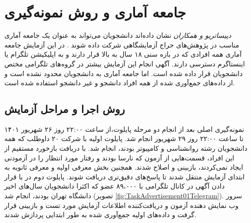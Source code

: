\section{جامعه آماری و روش نمونه‌گیری}
\textit{دپیساتریو و همکاران}
نشان داده‌اند دانشجویان می‌تواند به عنوان یک جامعه آماری مناسب در پژوهش‌های حراج آزمایشگاهی شرکت داده شوند
\!\citep{depositarioShouldStudentsBe2009}
\!. در این آزمایش جامعه آماری همه افرادی که در بازه سنی ۱۸ سال به بالا قرار دارند و به اپلیکیشن تلگرام یا اینستاگرم 
دسترسی دارند. آگهی انجام این آزمایش بیشتر در گروه‌های تلگرامی  مختص دانشجویان قرار داده شده است. اما جامعه آماری به دانشجویان 
محدود نشده است و از داده‌های جمع‌آوری شده از همه افراد دانشجو و غیر دانشجو استفاده شده است.
\subsection{روش اجرا و مراحل آزمایش}
نمونه‌گیری اصلی بعد از انجام دو مرحله پایلوت،از ساعت ۲۲:۰۰ روز ۲۶ شهریور ۱۴۰۱ تا ساعت ۲۲:۰۰ روز ۲۹ شهریور انجام شد. 
پایلوت اولیه با شرکت ۲۰  داوطلب که همه دانشجویان رشته روانشناسی و کامپیوتر بودند، انجام شد. با دریافت بازخورد مستقیم از این افراد، قسمت‌هایی از 
آزمون که نارسا بودند و رفتار مورد انتظار را در آزمودنی ایجاد نمی‌کردند، بازبینی و اصلاح شدند. همچنین بخش معرفی اولیه و معرفی ثانویه به ابتدای آزمایش منتقل شدند تا پاسخ‌های
دقیق‌تری دریافت شوند. پایلوت دوم در با قرار دادن آگهی در کانال تلگرامی با ۸۹،۰۰۰ عضو که اکثرا دانشجویان سال‌های اخیر دانشگاه تهران بودند، انجام شد
(\!تصویر \ref{fig:TaskAdvertisement01Telegram}).
سرور وب نمایش دهنده آزمون و دریافت‌کننده  اطلاعات آزمایش مورد تست و بازبینی قرار گرفت و داده‌های اولیه جمع‌آوری شده به طور ابتدایی پردازش شدند.
 
